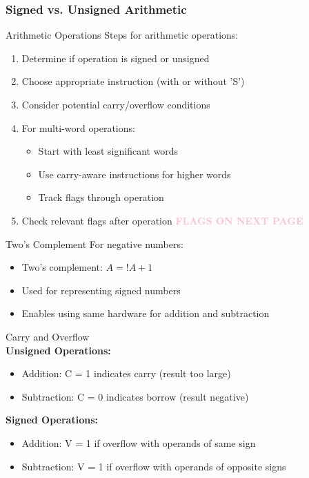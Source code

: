 \subsubsection{Signed vs. Unsigned Arithmetic}

\begin{KR}{Arithmetic Operations}
Steps for arithmetic operations:
\begin{enumerate}
  \item Determine if operation is signed or unsigned
  \item Choose appropriate instruction (with or without 'S')
  \item Consider potential carry/overflow conditions
  \item For multi-word operations:
    \begin{itemize}
      \item Start with least significant words
      \item Use carry-aware instructions for higher words
      \item Track flags through operation
    \end{itemize}
  \item Check relevant flags after operation \textcolor{pink}{\textbf{FLAGS ON NEXT PAGE}}
\end{enumerate}
\end{KR}

\begin{definition}{Two's Complement}
For negative numbers:
\begin{itemize}
  \item Two's complement: $A = !A + 1$
  \item Used for representing signed numbers
  \item Enables using same hardware for addition and subtraction
\end{itemize}
\end{definition}

\begin{concept}{Carry and Overflow}\\
\textbf{Unsigned Operations:}
\begin{itemize}
  \item Addition: C = 1 indicates carry (result too large)
  \item Subtraction: C = 0 indicates borrow (result negative)
\end{itemize}

\textbf{Signed Operations:}
\begin{itemize}
  \item Addition: V = 1 if overflow with operands of same sign
  \item Subtraction: V = 1 if overflow with operands of opposite signs
\end{itemize}
\end{concept}

